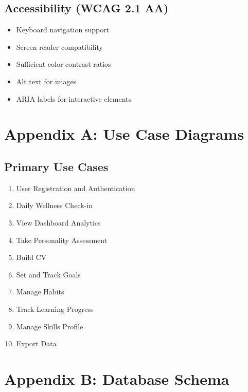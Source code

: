 \documentclass[12pt,a4paper]{article}
\begin{document}
\subsection{Accessibility (WCAG 2.1 AA)}
\begin{itemize}
    \item Keyboard navigation support
    \item Screen reader compatibility
    \item Sufficient color contrast ratios
    \item Alt text for images
    \item ARIA labels for interactive elements
\end{itemize}

\newpage
\appendix
\section{Appendix A: Use Case Diagrams}

\subsection{Primary Use Cases}
\begin{enumerate}
    \item User Registration and Authentication
    \item Daily Wellness Check-in
    \item View Dashboard Analytics
    \item Take Personality Assessment
    \item Build CV
    \item Set and Track Goals
    \item Manage Habits
    \item Track Learning Progress
    \item Manage Skills Profile
    \item Export Data
\end{enumerate}

\section{Appendix B: Database Schema}
\end{document}
